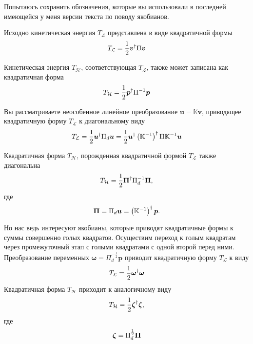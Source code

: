 \documentclass[12pt]{article}
\newcommand{\lb}{\left(}
\newcommand{\rb}{\right)}
\newcommand{\mL}{\mathcal{L}}
\newcommand{\mH}{\mathcal{H}}
\begin{document}
Попытаюсь сохранить обозначения, которые вы использовали в последней имеющейся у меня версии текста по поводу якобианов. \par
Исходно кинетическая энергия $T_\mL$ представлена в виде квадратичной формы
\begin{gather}
	T_\mL = \frac{1}{2} \boldsymbol{v}^\dagger \Pi \boldsymbol{v} \notag
\end{gather}

Кинетическая энергия $T_\mH$, соответствующая $T_\mL$, также может записана как квадратичная форма
\begin{gather}
	T_\mH = \frac{1}{2} \boldsymbol{p}^\dagger \Pi^{-1} \boldsymbol{p} \notag
\end{gather}

Вы рассматриваете неособенное линейное преобразование $\boldsymbol{u} = \mathbb{K} \boldsymbol{v}$, приводящее квадратичную форму $T_\mL$ к диагональному виду
\begin{gather}
	T_\mL = \frac{1}{2} \boldsymbol{u}^\dagger \Pi_d \boldsymbol{u} = \frac{1}{2} \boldsymbol{u}^\dagger \lb \mathbb{K}^{-1} \rb^\dagger \Pi \mathbb{K}^{-1} \boldsymbol{u} \notag
\end{gather}

Квадратичная форма $T_\mH$, порожденная квадратичной формой $T_\mL$ также диагональна 
\begin{gather}
		T_\mH = \frac{1}{2} \boldsymbol{\Pi}^\dagger \Pi_d^{-1} \boldsymbol{\Pi}, \notag
\end{gather}
где
\begin{gather}
	\boldsymbol{\Pi} = \Pi_d \boldsymbol{u} = \lb \mathbb{K}^{-1} \rb^\dagger \boldsymbol{p}. \notag
\end{gather}

Но нас ведь интересуют якобианы, которые приводят квадратичные формы к суммы совершенно голых квадратов. Осуществим переход к голым квадратам через промежуточный этап с голыми квадратами с одной второй перед ними. Преобразование переменных $\boldsymbol{\omega} = \Pi_d^{-\frac{1}{2}} \boldsymbol{p}$ приводит квадратичную форму $T_\mL$ к виду
\begin{gather}
	T_\mL = \frac{1}{2} \boldsymbol{\omega}^\dagger \boldsymbol{\omega} \notag
\end{gather}
Квадратичная форма $T_\mH$ приходит к аналогичному виду
\begin{gather}
	T_\mH = \frac{1}{2} \boldsymbol{\zeta}^\dagger \boldsymbol{\zeta},  \notag
\end{gather}
где
\begin{gather}
	\boldsymbol{\zeta} = \Pi_d^\frac{1}{2} \boldsymbol{\Pi} \notag
\end{gather}
\end{document}
